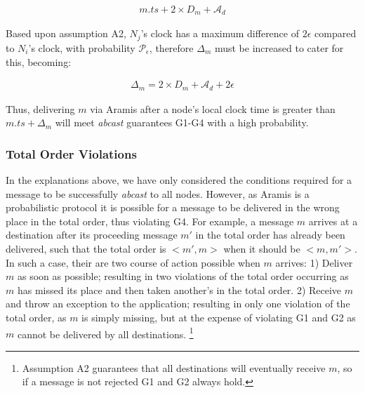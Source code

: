         \begin{equation*}
            \begin{aligned}
                m.ts + 2\times{D_m} + \mathcal{A}_d
            \end{aligned}
        \end{equation*}
         
         Based upon assumption A2, $N_j$'s clock has a maximum difference of $2\epsilon$ compared to $N_i$'s clock, with  probability $\mathcal{P}_\epsilon$, therefore $\Delta_m$ must be increased to cater for this, becoming:
        
        \begin{equation*}
            \begin{aligned}
                \Delta_m = 2 \times D_m + \mathcal{A}_d + 2\epsilon
            \end{aligned}
        \end{equation*}     
        
        Thus, delivering $m$ via \textsf{Aramis} after a node's local clock time is greater than $m.ts + \Delta_m$ will meet \emph{abcast} guarantees G1-G4 with a high probability.
                
        \subsubsection*{Total Order Violations}\label{ssec:abcast_rejection}
        In the explanations above, we have only considered the conditions required for a message to be successfully \emph{abcast} to all nodes.  However, as \textsf{Aramis} is a probabilistic protocol it is possible for a message to be delivered in the wrong place in the total order, thus violating G4.  For example, a message $m$ arrives at a destination after its proceeding message $m'$ in the total order has already been delivered, such that the total order is $<m', m>$ when it should be $<m, m'>$.  In such a case, their are two course of action possible when $m$ arrives: 1) Deliver $m$ as soon as possible; resulting in two violations of the total order occurring as $m$ has missed its place and then taken another's in the total order.  2) Receive $m$ and throw an exception to the application; resulting in only one violation of the total order, as $m$ is simply missing, but at the expense of violating G1 and G2 as $m$ cannot be delivered by all destinations.  \footnote{Assumption A2 guarantees that all destinations will eventually receive $m$, so if a message is not rejected G1 and G2 always hold.}
        
